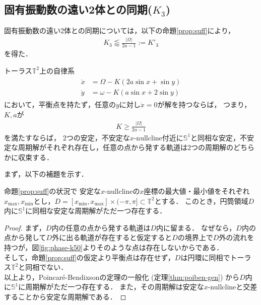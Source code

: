 \documentclass[../main]{subfiles}
\begin{document}
    \subsection{固有振動数の遠い2体との同期($K_3$)}
    \label{sec:3body-k3}
    固有振動数の遠い2体との同期については，以下の命題\ref{prop:suff}により，
    \begin{align*}
        K_3\lessapprox \frac{|\Omega|}{2a-1}:=K'_3
    \end{align*}
    を得た．
    \begin{proposition}
        \label{prop:suff}
        トーラス$\mathbb{T}^2$上の自律系
        \begin{align}
            \label{eq:prop-2phase}
            \begin{split}
                \dot{x}&=\Omega-K(2a\sin x+\sin y)\\
                \dot{y}&=\omega-K(a\sin x+2\sin y)
            \end{split}
        \end{align}
        において，平衡点を持たず，任意の$y$に対し$\dot{x}=0$が解を持つならば，
        つまり，$K,a$が
        \begin{align*}
            K\geq \frac{|\Omega|}{2a-1}
        \end{align*}
        を満たすならば，
        2つの安定，不安定な$x$-$\mathrm{nullcline}$付近に$\mathbb{S}^1$と同相な安定，不安定な周期解がそれぞれ存在し，任意の点から発する軌道は2つの周期解のどちらかに収束する．
    \end{proposition}
    まず，以下の補題を示す．
    \begin{lemma}
        \label{lemma:annulus}
        命題\ref{prop:suff}の状況で
        安定な$x$-nullclineの$x$座標の最大値・最小値をそれぞれ$x_{\max},x_{\min}$とし，$D=[x_{\min},x_{\max}]\times (-\pi,\pi ]\subset\mathbb{T}^2$とする．
        このとき，円筒領域$D$内に$\mathbb{S}^1$に同相な安定な周期解がただ一つ存在する．        
    \end{lemma}
    \begin{proof}
        まず，$D$内の任意の点から発する軌道は$D$内に留まる．
        なぜなら，$D$内の点から発して$D$外に出る軌道が存在すると仮定すると$D$の境界上で$D$外の流れを持つが，図\ref{fig:phase-k50}よりそのような点は存在しないからである．\\
        そして，命題\ref{prop:suff}の仮定より平衡点は存在せず，$D$は円環に同相でトーラス$\mathbb{T}^2$と同相でない．\\
        以上より，Poincar\'{e}-Bendixsonの定理の一般化 (定理\ref{thm:poiben-gen}) から$D$内に$\mathbb{S}^1$に周期解がただ一つ存在する．
        また，その周期解は安定な$x$-nullclineと交差することから安定な周期解である．        
    \end{proof}
\end{document}
